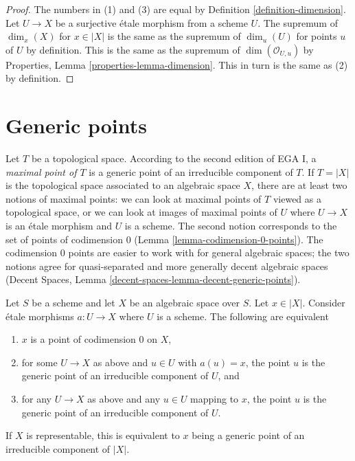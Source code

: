 \begin{proof}
The numbers in (1) and (3) are equal by Definition \ref{definition-dimension}.
Let $U \to X$ be a surjective \'etale morphism from a scheme $U$.
The supremum of $\dim_x(X)$ for $x \in |X|$ is the same as the
supremum of $\dim_u(U)$ for points $u$ of $U$ by definition.
This is the same as the supremum of $\dim(\mathcal{O}_{U, u})$ by
Properties, Lemma \ref{properties-lemma-dimension}. This in turn
is the same as (2) by definition.
\end{proof}




\section{Generic points}
\label{section-generic-points}

\noindent
Let $T$ be a topological space. According to the second edition of
EGA I, a {\it maximal point of $T$} is a generic point of an irreducible
component of $T$. If $T = |X|$ is the topological space associated to
an algebraic space $X$, there are at least two notions of maximal points:
we can look at maximal points of $T$ viewed as a topological space, or
we can look at images of maximal points of $U$ where $U \to X$ is an
\'etale morphism and $U$ is a scheme. The second notion corresponds to
the set of points of codimension $0$ (Lemma \ref{lemma-codimension-0-points}).
The codimension $0$ points are easier
to work with for general algebraic spaces; the two notions
agree for quasi-separated and more generally decent algebraic spaces
(Decent Spaces, Lemma \ref{decent-spaces-lemma-decent-generic-points}).

\begin{lemma}
\label{lemma-codimension-0-points}
Let $S$ be a scheme and let $X$ be an algebraic space over $S$.
Let $x \in |X|$. Consider \'etale morphisms $a : U \to X$ where
$U$ is a scheme. The following are equivalent
\begin{enumerate}
\item $x$ is a point of codimension $0$ on $X$,
\item for some $U \to X$ as above and $u \in U$ with $a(u) = x$,
the point $u$ is the generic point of an irreducible component of $U$, and
\item for any $U \to X$ as above and any $u \in U$ mapping to $x$,
the point $u$ is the generic point of an irreducible component of $U$.
\end{enumerate}
If $X$ is representable, this is equivalent to $x$ being a generic
point of an irreducible component of $|X|$.
\end{lemma}

